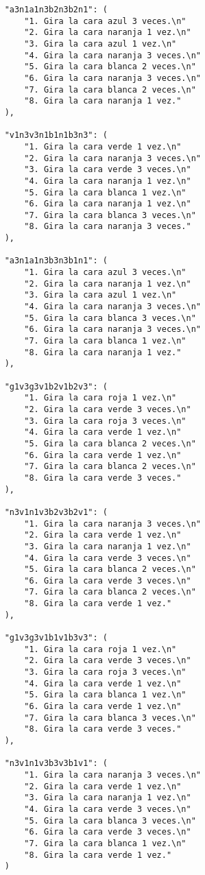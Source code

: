 \begin{lstlisting}
    "a3n1a1n3b2n3b2n1": (
        "1. Gira la cara azul 3 veces.\n"
        "2. Gira la cara naranja 1 vez.\n"
        "3. Gira la cara azul 1 vez.\n"
        "4. Gira la cara naranja 3 veces.\n"
        "5. Gira la cara blanca 2 veces.\n"
        "6. Gira la cara naranja 3 veces.\n"
        "7. Gira la cara blanca 2 veces.\n"
        "8. Gira la cara naranja 1 vez."
    ),
    
    "v1n3v3n1b1n1b3n3": (
        "1. Gira la cara verde 1 vez.\n"
        "2. Gira la cara naranja 3 veces.\n"
        "3. Gira la cara verde 3 veces.\n"
        "4. Gira la cara naranja 1 vez.\n"
        "5. Gira la cara blanca 1 vez.\n"
        "6. Gira la cara naranja 1 vez.\n"
        "7. Gira la cara blanca 3 veces.\n"
        "8. Gira la cara naranja 3 veces."
    ),
    
    "a3n1a1n3b3n3b1n1": (
        "1. Gira la cara azul 3 veces.\n"
        "2. Gira la cara naranja 1 vez.\n"
        "3. Gira la cara azul 1 vez.\n"
        "4. Gira la cara naranja 3 veces.\n"
        "5. Gira la cara blanca 3 veces.\n"
        "6. Gira la cara naranja 3 veces.\n"
        "7. Gira la cara blanca 1 vez.\n"
        "8. Gira la cara naranja 1 vez."
    ),
    
    "g1v3g3v1b2v1b2v3": (
        "1. Gira la cara roja 1 vez.\n"
        "2. Gira la cara verde 3 veces.\n"
        "3. Gira la cara roja 3 veces.\n"
        "4. Gira la cara verde 1 vez.\n"
        "5. Gira la cara blanca 2 veces.\n"
        "6. Gira la cara verde 1 vez.\n"
        "7. Gira la cara blanca 2 veces.\n"
        "8. Gira la cara verde 3 veces."
    ),
    
    "n3v1n1v3b2v3b2v1": (
        "1. Gira la cara naranja 3 veces.\n"
        "2. Gira la cara verde 1 vez.\n"
        "3. Gira la cara naranja 1 vez.\n"
        "4. Gira la cara verde 3 veces.\n"
        "5. Gira la cara blanca 2 veces.\n"
        "6. Gira la cara verde 3 veces.\n"
        "7. Gira la cara blanca 2 veces.\n"
        "8. Gira la cara verde 1 vez."
    ),
    
    "g1v3g3v1b1v1b3v3": (
        "1. Gira la cara roja 1 vez.\n"
        "2. Gira la cara verde 3 veces.\n"
        "3. Gira la cara roja 3 veces.\n"
        "4. Gira la cara verde 1 vez.\n"
        "5. Gira la cara blanca 1 vez.\n"
        "6. Gira la cara verde 1 vez.\n"
        "7. Gira la cara blanca 3 veces.\n"
        "8. Gira la cara verde 3 veces."
    ),
    
    "n3v1n1v3b3v3b1v1": (
        "1. Gira la cara naranja 3 veces.\n"
        "2. Gira la cara verde 1 vez.\n"
        "3. Gira la cara naranja 1 vez.\n"
        "4. Gira la cara verde 3 veces.\n"
        "5. Gira la cara blanca 3 veces.\n"
        "6. Gira la cara verde 3 veces.\n"
        "7. Gira la cara blanca 1 vez.\n"
        "8. Gira la cara verde 1 vez."
    )


\end{lstlisting}
